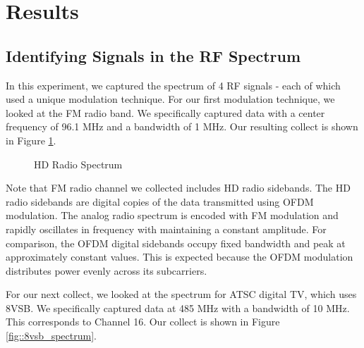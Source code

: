 \documentclass{article}
\begin{document}
\section{Results}


\subsection{Identifying Signals in the RF Spectrum}

In this experiment, we captured the spectrum of 4 RF signals - each of which used a unique modulation technique. For our first modulation technique, we looked at the FM radio band. We specifically captured data with a center frequency of 96.1 MHz and a bandwidth of 1 MHz. Our resulting collect is shown in Figure \ref{fig::hd_radio_spectrum}.

\begin{figure}[H]
	\centerline{}
	\caption{HD Radio Spectrum}
	\label{fig::hd_radio_spectrum}
\end{figure}


Note that FM radio channel we collected includes HD radio sidebands. The HD radio sidebands are digital copies of the data transmitted using OFDM modulation. The analog radio spectrum is encoded with FM modulation and rapidly oscillates in frequency with maintaining a constant amplitude. For comparison, the OFDM digital sidebands occupy fixed bandwidth and peak at approximately constant values. This is expected because the OFDM modulation distributes power evenly across its subcarriers.

For our next collect, we looked at the spectrum for ATSC digital TV, which uses 8VSB. We specifically captured data at 485 MHz with a bandwidth of 10 MHz. This corresponds to Channel 16. Our collect is shown in Figure \ref{fig::8vsb_spectrum}.
\end{document}
